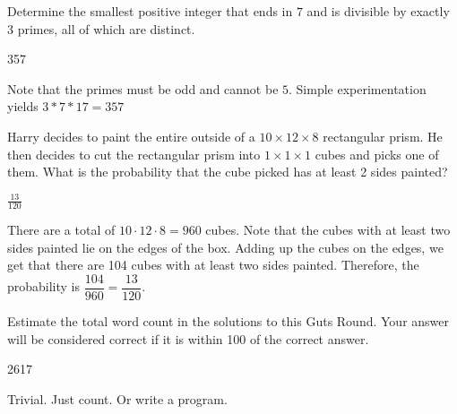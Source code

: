 \documentclass[11pt]{article}
\begin{document}
\begin{problem}
Determine the smallest positive integer that ends in $7$ and is divisible by exactly 3 primes, all of which are distinct.
\end{problem}

\begin{answer}
357
\end{answer}

\begin{solution}
Note that the primes must be odd and cannot be $5$. Simple experimentation yields $3*7*17 = 357$
\end{solution}


\begin{problem}
Harry decides to paint the entire outside of a $10 \times 12 \times 8$ rectangular prism. He then decides to cut the rectangular prism into $1 \times 1 \times 1$ cubes and picks one of them. What is the probability that the cube picked has at least 2 sides painted? 
\end{problem}

\begin{answer}
$\frac{13}{120}$
\end{answer}

\begin{solution}
There are a total of $10 \cdot 12 \cdot 8 = 960$ cubes. Note that the cubes with at least two sides painted lie on the edges of the box. Adding up the cubes on the edges, we get that there are 104 cubes with at least two sides painted. Therefore, the probability is $\dfrac{104}{960} = \dfrac{13}{120}$.
\end{solution}
 

\begin{problem}
Estimate the total word count in the solutions to this Guts Round. Your answer will be considered correct if it is within 100 of the correct answer.
\end{problem}

\begin{answer}
2617
\end{answer}

\begin{solution}
Trivial. Just count. Or write a program.
\end{solution}
\end{document}
